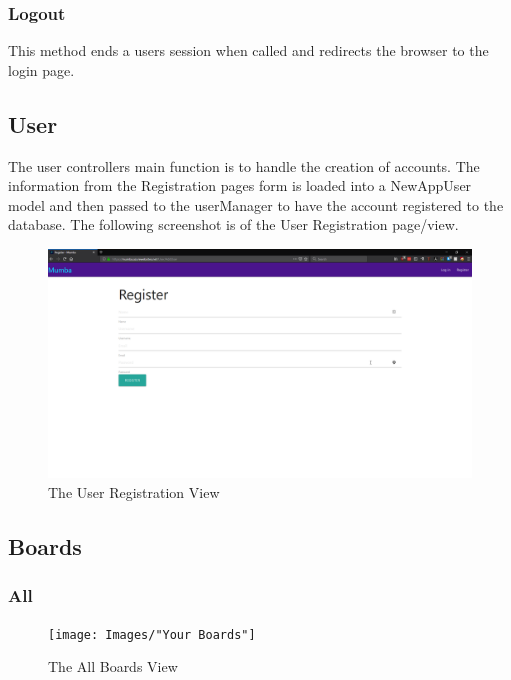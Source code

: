 \documentclass[letterpaper]{article}
\begin{document}
\subsubsection{Logout}
This method ends a users session when called and redirects the browser to the login page.

\subsection{User}

The user controllers main function is to handle the creation of accounts. The information from the Registration pages form is loaded into a NewAppUser model and then passed to the userManager to have the account registered to the database. The following screenshot is of the User Registration page/view.

\begin{figure}[H]
  \centering
  \caption{The User Registration View}
  \includegraphics[scale=0.2]{Images/Register}
\end{figure}


\subsection{Boards}

\subsubsection{All}
\begin{figure}[H]
  \centering
  \caption{The All Boards View}
  \texttt{[image: Images/"Your Boards"]}
\end{figure}
\end{document}
